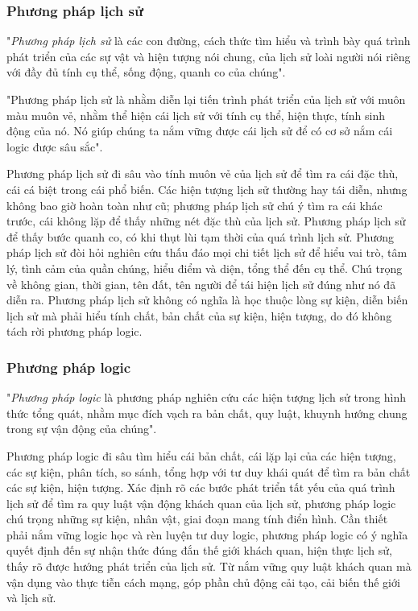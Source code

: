 \subsubsection{Phương pháp lịch sử}
"\textit{Phương pháp lịch sử} là các con đường, cách thức tìm hiểu và trình bày quá trình phát triển của các sự vật và hiện tượng nói chung, của lịch sử loài người nói riêng với đầy đủ tính cụ thể, sống động, quanh co của chúng".

"Phương pháp lịch sử là nhằm diễn lại tiến trình phát triển của lịch sử với muôn màu muôn vẻ, nhằm thể hiện cái lịch sử với tính cụ thể, hiện thực, tính sinh động của nó. Nó giúp chúng ta nắm vững được cái lịch sử để có cơ sở nắm cái logic được sâu sắc".

Phương pháp lịch sử đi sâu vào tính muôn vẻ của lịch sử để tìm ra cái đặc thù, cái cá biệt trong cái phổ biến. Các hiện tượng lịch sử thường hay tái diễn, nhưng không bao giờ hoàn toàn như cũ; phương pháp lịch sử chú ý tìm ra cái khác trước, cái không lặp để thấy những nét đặc thù của lịch sử. Phương pháp lịch sử để thấy bước quanh co, có khi thụt lùi tạm thời của quá trình lịch sử. Phương pháp lịch sử đòi hỏi nghiên cứu thấu đáo mọi chi tiết lịch sử để hiểu vai trò, tâm lý, tình cảm của quần chúng, hiểu điểm và diện, tổng thể đến cụ thể. Chú trọng về không gian, thời gian, tên đất, tên người để tái hiện lịch sử đúng như nó đã diễn ra. Phương pháp lịch sử không có nghĩa là học thuộc lòng sự kiện, diễn biến lịch sử mà phải hiểu tính chất, bản chất của sự kiện, hiện tượng, do đó không tách rời phương pháp logic.

\subsubsection{Phương pháp logic}
"\textit{Phương pháp logic} là phương pháp nghiên cứu các hiện tượng lịch sử trong hình thức tổng quát, nhằm mục đích vạch ra bản chất, quy luật, khuynh hướng chung trong sự vận động của chúng".

Phương pháp logic đi sâu tìm hiểu cái bản chất, cái lặp lại của các hiện tượng, các sự kiện, phân tích, so sánh, tổng hợp với tư duy khái quát để tìm ra bản chất các sự kiện, hiện tượng. Xác định rõ các bước phát triển tất yếu của quá trình lịch sử để tìm ra quy luật vận động khách quan của lịch sử, phương pháp logic chú trọng những sự kiện, nhân vật, giai đoạn mang tính điển hình. Cần thiết phải nắm vững logic học và rèn luyện tư duy logic, phương pháp logic có ý nghĩa quyết định đến sự nhận thức đúng đắn thế giới khách quan, hiện thực lịch sử, thấy rõ được hướng phát triển của lịch sử. Từ nắm vững quy luật khách quan mà vận dụng vào thực tiễn cách mạng, góp phần chủ động cải tạo, cải biến thế giới và lịch sử.


